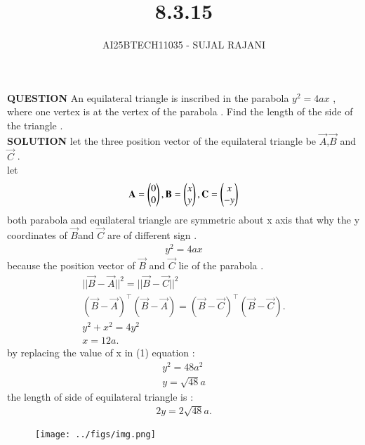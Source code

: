 \documentclass[journal,12pt,onecolumn]{IEEEtran}
\begin{document}
\title{8.3.15}
\author{AI25BTECH11035 - SUJAL RAJANI}
{\let\newpage\relax\maketitle}
\textbf{QUESTION}
An equilateral triangle is inscribed in the parabola $y^2=4ax$
, where one vertex is at the vertex of the parabola . Find the length of the side of the triangle .
\\
\textbf{SOLUTION}
 let the three position vector  of the equilateral triangle be $\vec{A}$,$\vec{B}$ and $\vec{C}$ .
 \\
 let 
 \\
 \begin{align*}
     \mathbf{A}=\begin{pmatrix}0\\0\end{pmatrix}, \mathbf{B}=\begin{pmatrix}x\\y\end{pmatrix}, \mathbf{C}=\begin{pmatrix}x\\-y\end{pmatrix}
 \end{align*}
 both parabola and equilateral triangle are symmetric about x axis  that why the y coordinates of $\vec{B} $and $\vec{C}$ are of different sign .
 \\
  \begin{align*}
      y^2=4ax 
  \end{align*}
  because the position vector of $\vec{B}$ and $\vec{C}$ lie of the parabola .
  \begin{align*}
      ||\vec{B}-\vec{A}||^2=||\vec{B}-\vec{C}||^2
      \\
      (\vec{B}-\vec{A})^\top(\vec{B}-\vec{A})=(\vec{B}-\vec{C})^\top(\vec{B}-\vec{C}) .
      \\
      y^2+x^2=4y^2
      \\
      x=12a.
 \end{align*}
 by replacing the value of x in (1) equation :
\\
\begin{align*}
    y^2=48a^2
    \\
    y=\sqrt{48}a
\end{align*}
the length of side of equilateral triangle is :
\begin{align*}
    2y=2\sqrt{48}a.
\end{align*}
        \begin{figure}[H]
    \centering
    \texttt{[image: ../figs/img.png]}
    \caption*{}
    \label{figs}
\end{figure}
\end{document}
